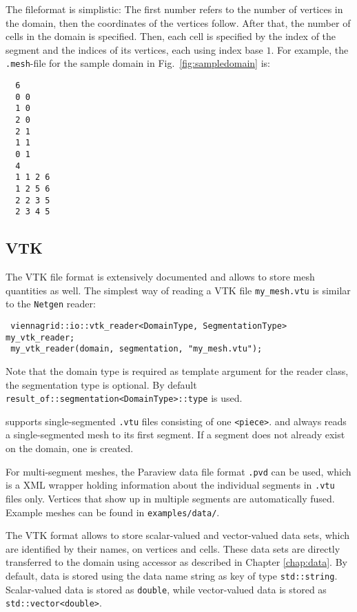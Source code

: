  The fileformat is simplistic: The first number refers to the number of vertices in the domain, then the coordinates of the vertices follow. After that, the number of cells in the domain is specified. Then, each cell is specified by the index of the segment and the indices of its vertices, each using index base $1$.
 For example, the \texttt{.mesh}-file for the sample domain in Fig.~\ref{fig:sampledomain} is:
 \begin{verbatim}
  6
  0 0
  1 0
  2 0
  2 1
  1 1
  0 1
  4
  1 1 2 6
  1 2 5 6
  2 2 3 5
  2 3 4 5
 \end{verbatim}

 \subsection{VTK}
 The VTK file format is extensively documented \cite{VTKfileformat} and allows to store mesh quantities as well.
 The simplest way of reading a VTK file \lstinline|my_mesh.vtu| is similar to the \texttt{Netgen} reader:
 \begin{lstlisting}
 viennagrid::io::vtk_reader<DomainType, SegmentationType>  my_vtk_reader;
 my_vtk_reader(domain, segmentation, "my_mesh.vtu");
 \end{lstlisting}
 Note that the domain type is required as template argument for the reader class, the segmentation type is optional. By default \lstinline|result_of::segmentation<DomainType>::type| is used.

 {\ViennaGrid} supports single-segmented \lstinline|.vtu| files consisting of one \lstinline|<piece>|.
 and always reads a single-segmented mesh to its first segment. If a segment does not already exist on the domain, one is created.

 For multi-segment meshes, the Paraview \cite{paraview} data file format \lstinline|.pvd| can be used, which is a XML wrapper holding information about the individual segments in \lstinline|.vtu| files only. Vertices that show up in multiple segments are automatically fused. Example meshes can be found in \texttt{examples/data/}.


 The VTK format allows to store scalar-valued and vector-valued data sets, which are identified by their names, on vertices and cells.
 These data sets are directly transferred to the {\ViennaGrid} domain using accessor as described in Chapter \ref{chap:data}.
 By default, data is stored using the data name string as key of type \lstinline|std::string|.
 Scalar-valued data is stored as \lstinline|double|, while vector-valued data is stored as \lstinline|std::vector<double>|.

